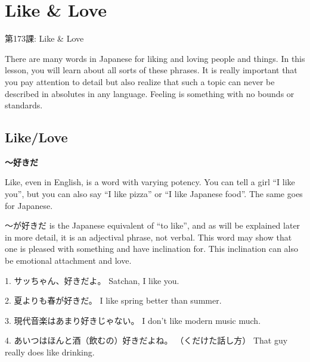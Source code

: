     
\chapter{Like \& Love}

\begin{center}
\begin{Large}
第173課: Like \& Love 
\end{Large}
\end{center}
 
\par{ There are many words in Japanese for liking and loving people and things. In this lesson, you will learn about all sorts of these phrases. It is really important that you pay attention to detail but also realize that such a topic can never be described in absolutes in any language. Feeling is something with no bounds or standards. }
      
\section{Like\slash Love}
 
\begin{center}
\textbf{～好きだ } 
\end{center}

\par{ Like, even in English, is a word with varying potency. You can tell a girl “I like you”, but you can also say “I like pizza” or “I like Japanese food”. The same goes for Japanese. }

\par{ ～が好きだ is the Japanese equivalent of “to like”, and as will be explained later in more detail, it is an adjectival phrase, not verbal. This word may show that one is pleased with something and have inclination for. This inclination can also be emotional attachment and love. }

\par{1. サッちゃん、好きだよ。 \hfill\break
Satchan, I like you. }

\par{2. 夏よりも春が好きだ。 \hfill\break
I like spring better than summer. }

\par{3. 現代音楽はあまり好きじゃない。 \hfill\break
I don't like modern music much. }

\par{4. あいつはほんと酒（飲むの）好きだよね。 （くだけた話し方） \hfill\break
That guy really does like drinking. }

